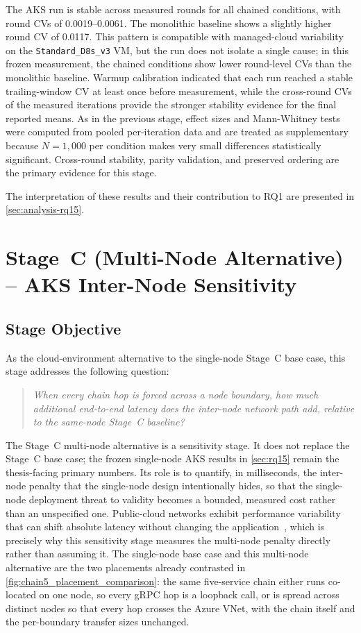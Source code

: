 The AKS run is stable across measured rounds for all chained conditions, with
round CVs of 0.0019--0.0061. The monolithic baseline shows a slightly higher
round CV of 0.0117. This pattern is compatible with managed-cloud variability on
the \texttt{Standard\_D8s\_v3} VM, but the run does not isolate a single cause; in
this frozen measurement, the chained conditions show lower round-level CVs than the
monolithic baseline. Warmup calibration
indicated that each run reached a stable trailing-window CV at least once before
measurement, while the cross-round CVs of the measured iterations provide the stronger
stability evidence for the final reported means. As in the previous stage, effect sizes
and Mann-Whitney tests were computed from pooled per-iteration data and are treated as
supplementary because $N = 1{,}000$ per condition makes very small differences
statistically significant. Cross-round stability, parity validation, and preserved
ordering are the primary evidence for this stage.

The interpretation of these results and their contribution to RQ1 are presented in
\cref{sec:analysis-rq15}.

\section{Stage~C (Multi-Node Alternative) -- AKS Inter-Node Sensitivity}
\label{sec:rq15b}

\subsection{Stage Objective}

As the cloud-environment alternative to the single-node Stage~C base case, this stage addresses the following question:

\begin{quote}
\textit{When every chain hop is forced across a node boundary, how much additional
end-to-end latency does the inter-node network path add, relative to the same-node
Stage~C baseline?}
\end{quote}

The Stage~C multi-node alternative is a sensitivity stage. It does not replace the Stage~C base case; the frozen single-node AKS
results in \cref{sec:rq15} remain the thesis-facing primary numbers. Its role
is to quantify, in milliseconds, the inter-node penalty that the single-node
design intentionally hides, so that the single-node deployment threat to validity
becomes a bounded, measured cost rather than an unspecified one. Public-cloud
networks exhibit performance variability that can shift absolute latency without
changing the application~\cite{noise_in_clouds}, which is precisely why this
sensitivity stage measures the multi-node penalty directly rather than assuming
it. The single-node base case and this multi-node alternative are the two
placements already contrasted in \cref{fig:chain5_placement_comparison}: the same
five-service chain either runs co-located on one node, so every gRPC hop is a
loopback call, or is spread across distinct nodes so that every hop crosses the
Azure VNet, with the chain itself and the per-boundary transfer sizes unchanged.

